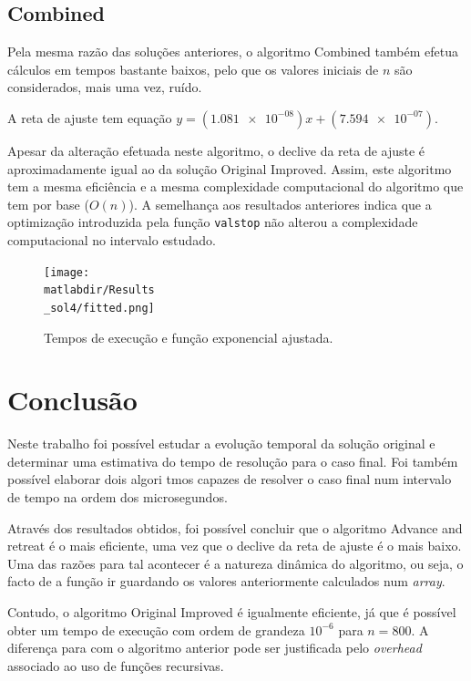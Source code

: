 \documentclass[portuguese,11pt,a4paper,titlepage]{article}
\newcommand{\foreign}[1]{\textit{#1}}
\newcommand{\matlabdir}{"../MATLAB-fittings"}
\begin{document}
\subsection{Combined}
Pela mesma razão das soluções anteriores, o algoritmo Combined também efetua cálculos em tempos bastante
baixos, pelo que os valores iniciais de \begin{math}n\end{math} são considerados, mais uma vez, ruído.

A reta de ajuste tem equação \begin{math}y=(\num{1.081e-08})x+(\num{7.594e-07})\end{math}.

Apesar da alteração efetuada neste algoritmo, o declive da reta de ajuste é aproximadamente igual ao da
solução Original Improved.
Assim, este algoritmo tem a mesma eficiência e a mesma complexidade computacional do algoritmo que tem por base (\begin{math}O(n)\end{math}).
A semelhança aos resultados anteriores indica que a optimização introduzida pela função \verb#valstop# não alterou a complexidade computacional no intervalo estudado.

\begin{figure}[h]
	\centering
	\texttt{[image: \\matlabdir/Results\\\_sol4/fitted.png]}
	\caption{Tempos de execução e função exponencial ajustada.}
	\label{fig:sol4}
\end{figure}
\pagebreak

\section{Conclusão}
Neste trabalho foi possível estudar a evolução temporal da solução original e determinar
uma estimativa do tempo de resolução para o caso final. Foi também possível elaborar dois algori%
tmos capazes de resolver o caso final num intervalo de tempo na ordem dos microsegundos.

Através dos resultados obtidos, foi possível concluir que o algoritmo Advance and
retreat é o mais eficiente, uma vez que o declive da reta de ajuste é o mais baixo.
Uma das razões para tal acontecer é a natureza dinâmica do algoritmo,
ou seja, o facto de a função ir guardando os valores anteriormente calculados num \foreign{array}.

Contudo, o algoritmo Original Improved é igualmente eficiente, já que é possível obter um tempo de execução
com ordem de grandeza \begin{math}10^{-6}\end{math} para \begin{math}n = 800\end{math}. A diferença para com o algoritmo anterior pode ser justificada pelo \foreign{overhead}
associado ao uso de funções recursivas.
\end{document}
